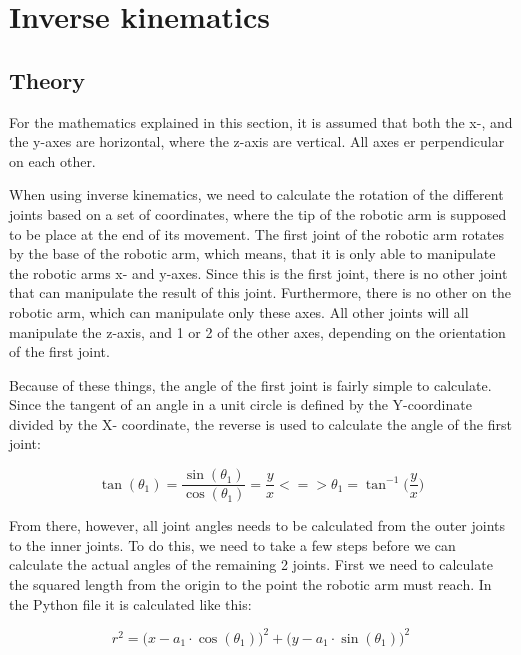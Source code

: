 \section{Inverse kinematics}

\subsection{Theory}
\label{theory}

For the mathematics explained in this section, it is assumed that both the x-, and the y-axes are horizontal, where the z-axis are vertical. All axes er perpendicular on each other.

When using inverse kinematics, we need to calculate the rotation of the different joints based on a set of coordinates, where the tip of the robotic arm is supposed to be place at the end of its movement. \newline
The first joint of the robotic arm rotates by the base of the robotic arm, which means, that it is only able to manipulate the robotic arms x- and y-axes. Since this is the first joint, there is no other joint that can manipulate the result of this joint. Furthermore, there is no other on the robotic arm, which can manipulate only these axes. All other joints will all manipulate the z-axis, and 1 or 2 of the other axes, depending on the orientation of the first joint.

Because of these things, the angle of the first joint is fairly simple to calculate. Since the tangent of an angle in a unit circle is defined by the Y-coordinate divided by the X- coordinate, the reverse is used to calculate the angle of the first joint:

\begin{equation*}
 \tan(\theta_1) = \frac{\sin(\theta_1)}{\cos(\theta_1)} = \frac{y}{x}
 <=>
 \theta_1 = \tan^{-1}\Big(\frac{y}{x}\Big)   
\end{equation*}

From there, however,  all joint angles needs to be calculated from the outer joints to the inner joints. To do this, we need to take a few steps before we can calculate the actual angles of the remaining 2 joints. First we need to calculate the squared length from the origin to the point the robotic arm must reach. In the Python file it is calculated like this:

\begin{equation*}
    r^2 = \big(x - a_1 \cdot \cos(\theta_1)\big)^2 + \big(y - a_1 \cdot \sin(\theta_1)\big)^2
\end{equation*}

